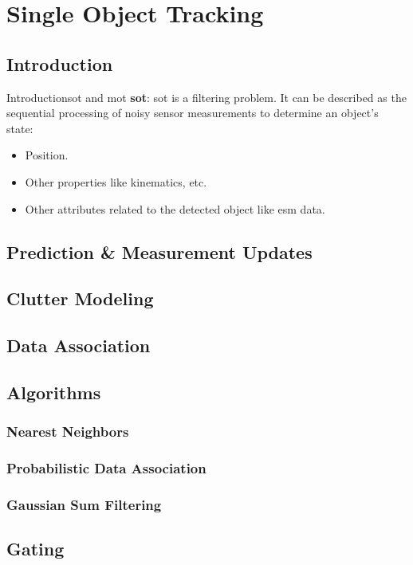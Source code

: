 \documentclass{beamer}
\begin{document}
	\section{Single Object Tracking}	
	\subsection{Introduction}
	\begin{frame}{Introduction}{\acrfull{sot} and \acrfull{mot}}
		\textbf{\acrfull{sot}}: \acrshort{sot} is a			filtering problem. It can be described as the sequential processing of noisy sensor measurements to determine an object’s state:
		\begin{itemize}
			\item Position.
			\item Other properties like kinematics, etc.
			\item Other attributes related to the detected object like \gls{esm} data.
		\end{itemize}
	\end{frame}
	\subsection{Prediction \& Measurement Updates}
	\subsection{Clutter Modeling}
	\subsection{Data Association}
	\subsection{Algorithms}
	\subsubsection{Nearest Neighbors}
	\subsubsection{Probabilistic Data Association}
	\subsubsection{Gaussian Sum Filtering}
	\subsection{Gating}
\end{document}
